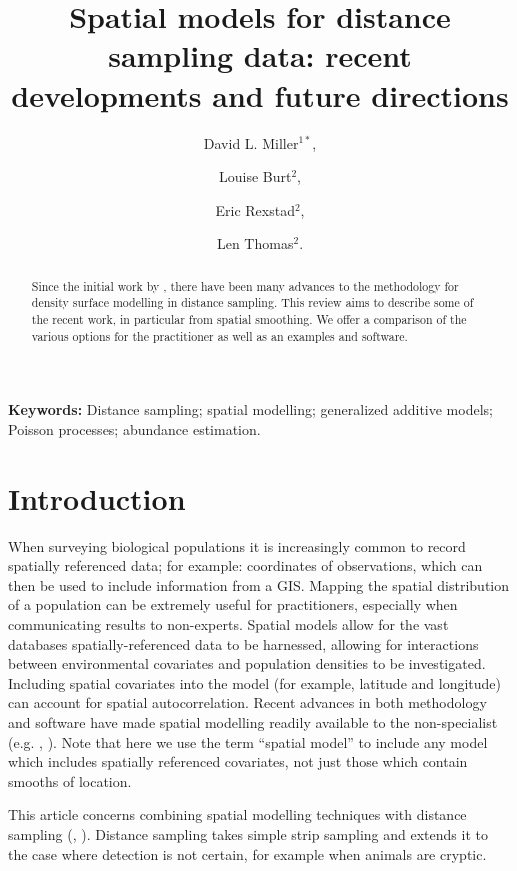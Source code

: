 \documentclass[a4paper,12pt]{article}
\title{Spatial models for distance sampling data: recent developments and future directions}
\author{
David L. Miller$^{1*}$, \and
Louise Burt$^{2}$, \and
Eric Rexstad$^{2}$, \and 
Len Thomas$^{2}$.}
\begin{document}
\maketitle


\begin{abstract}
  \noindent 
Since the initial work by \cite{Hedley:2004et}, there have been many advances to the methodology for density surface modelling in distance sampling. This review aims to describe some of the recent work, in particular from spatial smoothing.  We offer a comparison of the various options for the practitioner as well as an examples and software.

\end{abstract}

\noindent \textbf{Keywords:} Distance sampling; spatial modelling; generalized additive models; Poisson processes; abundance estimation.



\newpage


\section*{Introduction}

\label{s:intro}


When surveying biological populations it is increasingly common to record spatially referenced data; for example: coordinates of observations, which can then be used to include information from a GIS. Mapping the spatial distribution of a population can be extremely useful for practitioners, especially when communicating results to non-experts. Spatial models allow for the vast databases spatially-referenced data to be harnessed, allowing for interactions between environmental covariates and population densities to be investigated. Including spatial covariates into the model (for example, latitude and longitude) can account for spatial autocorrelation. Recent advances in both methodology and software have made spatial modelling readily available to the non-specialist (e.g. \cite{Wood:2006wz}, \cite{Rue:2009tw}). Note that  here we use the term ``spatial model'' to include any model which includes spatially referenced covariates, not just those which contain smooths of location.

This article concerns combining spatial modelling techniques with distance sampling (\cite{Buckland:2001vm}, \cite{Buckland:2004ts}). Distance sampling takes simple strip sampling and extends it to the case where detection is not certain, for example when animals are cryptic. 
\end{document}
